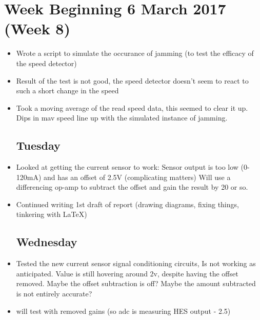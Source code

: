 \documentclass[a4]{report}
\def\mon{\subsection*{Monday}}
\def\tue{\subsection*{Tuesday}}
\def\wed{\subsection*{Wednesday}}
\begin{document}
	\section{Week Beginning 6 March 2017 (Week 8)}
	\begin{itemize}
		\mon
		\item Wrote a script to simulate the occurance of jamming (to test the efficacy of the speed detector)
		\item Result of the test is not good, the speed detector doesn't seem to react to such a short change in the speed
		\item Took a moving average of the read speed data, this seemed to clear it up. Dips in mav speed line up with the simulated instance of jamming.
		\tue
		\item Looked at getting the current sensor to work:
		\subitem Sensor output is too low (0-120mA) and has an offset of 2.5V (complicating matters)
		\subitem Will use a differencing op-amp to subtract the offset and gain the result by 20 or so.
		\item Continued writing 1st draft of report (drawing diagrams, fixing things, tinkering with \LaTeX)
		\wed
		\item Tested the new current sensor signal conditioning circuits, Is not working as anticipated. Value is still hovering around 2v, despite having the offset removed. Maybe the offset subtraction is off? Maybe the amount subtracted is not entirely accurate?
		\item will test with removed gains (so adc is measuring HES output - 2.5)
		

	\end{itemize}
	\newpage
\end{document}
